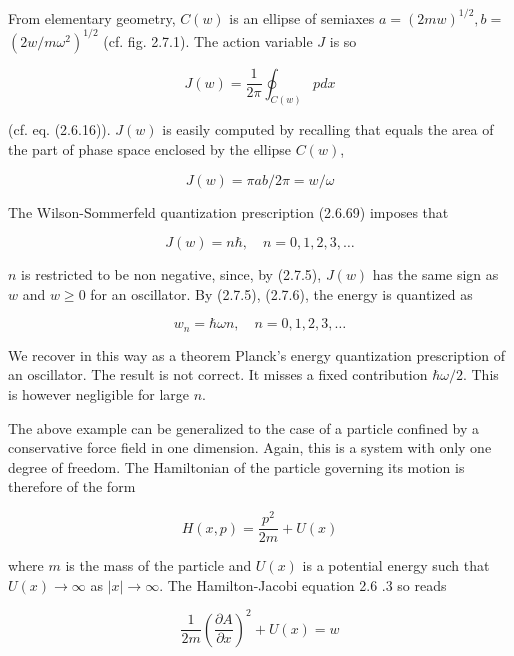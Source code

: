 \documentclass{article}
\begin{document}
From elementary geometry, $C(w)$ is an ellipse of semiaxes $a=(2 m w)^{1 / 2}, b=$ $\left(2 w / m \omega^{2}\right)^{1 / 2}$ (cf. fig. 2.7.1). The action variable $J$ is so
 
\begin{equation*}
J(w)=\frac{1}{2 \pi} \oint_{C(w)} p d x \tag{2.7.4}
\end{equation*}
 
(cf. eq. (2.6.16)). $J(w)$ is easily computed by recalling that equals the area of the part of phase space enclosed by the ellipse $C(w)$,
 
\begin{equation*}
J(w)=\pi a b / 2 \pi=w / \omega \tag{2.7.5}
\end{equation*}
 

The Wilson-Sommerfeld quantization prescription (2.6.69) imposes that
 
\begin{equation*}
J(w)=n \hbar, \quad n=0,1,2,3, \ldots \tag{2.7.6}
\end{equation*}
 
$n$ is restricted to be non negative, since, by (2.7.5), $J(w)$ has the same sign as $w$ and $w \geq 0$ for an oscillator. By (2.7.5), (2.7.6), the energy is quantized as
 
\begin{equation*}
w_{n}=\hbar \omega n, \quad n=0,1,2,3, \ldots \tag{2.7.7}
\end{equation*}
 

We recover in this way as a theorem Planck's energy quantization prescription of an oscillator. The result is not correct. It misses a fixed contribution $\hbar \omega / 2$. This is however negligible for large $n$.

The above example can be generalized to the case of a particle confined by a conservative force field in one dimension. Again, this is a system with only one degree of freedom. The Hamiltonian of the particle governing its motion is therefore of the form
 
\begin{equation*}
H(x, p)=\frac{p^{2}}{2 m}+U(x) \tag{2.7.8}
\end{equation*}
 
where $m$ is the mass of the particle and $U(x)$ is a potential energy such that $U(x) \rightarrow \infty$ as $|x| \rightarrow \infty$. The Hamilton-Jacobi equation 2.6 .3 so reads
 
\begin{equation*}
\frac{1}{2 m}\left(\frac{\partial A}{\partial x}\right)^{2}+U(x)=w \tag{2.7.9}
\end{equation*}
 
\end{document}
